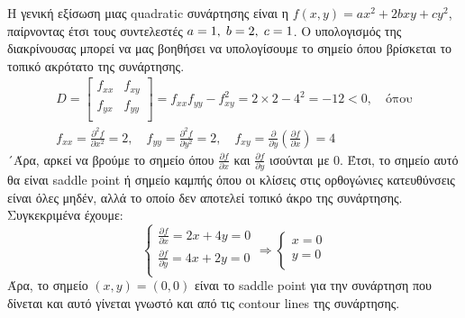 Η γενική εξίσωση μιας quadratic συνάρτησης είναι η $f(x,y) = ax^2 + 2bxy + cy^2$, παίρνοντας έτσι τους συντελεστές $a=1, \hspace{1mm} b=2, \hspace{1mm} c=1$.
Ο υπολογισμός της διακρίνουσας μπορεί να μας βοηθήσει να υπολογίσουμε το σημείο όπου βρίσκεται το τοπικό ακρότατο της συνάρτησης. 
\begin{equation}
\begin{gathered}
D =
\left[
\begin{array}{cc}
	f_{xx} & f_{xy} \\
	f_{yx} & f_{yy} \\
\end{array}
\right]
= f_{xx} f_{yy} - f^2_{xy} = 2 \times 2 - 4^2 = -12 < 0, \quad \text{όπου} \\
f_{xx} = \frac{\partial^2 f}{\partial x^2} = 2, \quad
f_{yy} = \frac{\partial^2 f}{\partial y^2} = 2, \quad
f_{xy} = \frac{\partial}{\partial y} \left( \frac{\partial f}{\partial x} \right) = 4
\end{gathered}
\end{equation}
´Άρα, αρκεί να βρούμε το σημείο όπου $\frac{\partial f}{\partial x}$ και $\frac{\partial f}{\partial y}$ ισούνται με 0. Έτσι, το σημείο αυτό θα είναι saddle point ή σημείο καμπής όπου οι κλίσεις στις ορθογώνιες κατευθύνσεις είναι όλες μηδέν, αλλά το οποίο δεν αποτελεί τοπικό άκρο της συνάρτησης.
Συγκεκριμένα έχουμε: 
\begin{equation}
\left\{
\begin{array}{c}
	\frac{\partial f}{\partial x} = 2x + 4y = 0 \\ 
	\frac{\partial f}{\partial y} = 4x + 2y = 0 \\
\end{array}
\right.
\Rightarrow
\left\{
\begin{array}{c}
	x = 0\\y=0\\
\end{array}
\right.
\end{equation}
Άρα, το σημείο $(x,y) = (0,0)$ είναι το saddle point για την συνάρτηση που δίνεται και αυτό γίνεται γνωστό και από τις contour lines της συνάρτησης.